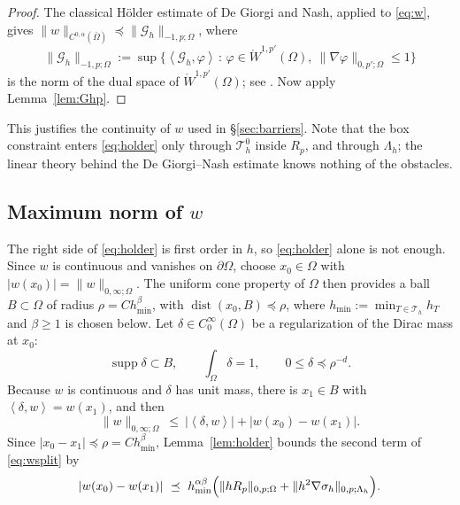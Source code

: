 \documentclass[12pt]{amsart}
\theoremstyle{definition}
\newcommand{\Om}{\Omega}
\newcommand{\dOm}{\partial\Omega}
\newcommand{\Th}{\mathcal{T}_h}
\newcommand{\Thzero}{\Th^0}
\newcommand{\Gh}{\mathcal{G}_h}
\newcommand{\Lamh}{\Lambda_h}
\begin{document}
\begin{proof}
The classical H\"older estimate of De Giorgi and Nash, applied to \eqref{eq:w}, gives $\|w\|_{C^{0,\alpha}(\bar\Om)} \preceq \|\Gh\|_{-1,p;\Om}$, where
\[
  \|\Gh\|_{-1,p;\Om} := \sup\bigl\{\left<\Gh,\varphi\right> \,:\, \varphi \in \mathring W^{1,p'}(\Om),\ \|\nabla\varphi\|_{0,p';\Om} \le 1\bigr\}
\]
is the norm of the dual space of $\mathring W^{1,p'}(\Om)$; see \cite[Theorem C.2]{KinderlehrerStampacchia1980}.  Now apply Lemma~\ref{lem:Ghp}.
\end{proof}

This justifies the continuity of $w$ used in \S \ref{sec:barriers}.  Note that the box constraint enters \eqref{eq:holder} only through $\Thzero$ inside $R_p$, and through $\Lamh$; the linear theory behind the De Giorgi--Nash estimate knows nothing of the obstacles.


\subsection{Maximum norm of \texorpdfstring{$w$}{w}}

The right side of \eqref{eq:holder} is first order in $h$, so \eqref{eq:holder} alone is not enough.  Since $w$ is continuous and vanishes on $\dOm$, choose $x_0\in\Om$ with $|w(x_0)| = \|w\|_{0,\infty;\Om}$.  The uniform cone property of $\Om$ \cite[\S 4.7]{Adams1975} then provides a ball $B \subset \Om$ of radius $\rho = C h_{\min}^\beta$, with $\operatorname{dist}(x_0,B) \preceq \rho$, where $h_{\min} := \min_{T\in\Th} h_T$ and $\beta \ge 1$ is chosen below.  Let $\delta \in C_0^\infty(\Om)$ be a regularization of the Dirac mass at $x_0$:
\begin{equation}
\label{eq:delta}
  \operatorname{supp}\delta \subset B, \qquad \int_\Om \delta = 1, \qquad 0 \le \delta \preceq \rho^{-d}.
\end{equation}
Because $w$ is continuous and $\delta$ has unit mass, there is $x_1 \in B$ with $\left<\delta,w\right> = w(x_1)$, and then
\begin{equation}
\label{eq:wsplit}
  \|w\|_{0,\infty;\Om} \ \le\ \bigl|\left<\delta,w\right>\bigr| + |w(x_0)-w(x_1)|.
\end{equation}
Since $|x_0 - x_1| \preceq \rho = C h_{\min}^\beta$, Lemma~\ref{lem:holder} bounds the second term of \eqref{eq:wsplit} by
\begin{equation}
\label{eq:holderapplied}
  |w(x_0)-w(x_1)| \ \preceq\ h_{\min}^{\alpha\beta}\Bigl(\|hR_p\|_{0,p;\Om} + \|h^2\nabla\sigma_h\|_{0,p;\Lamh}\Bigr).
\end{equation}
\end{document}
